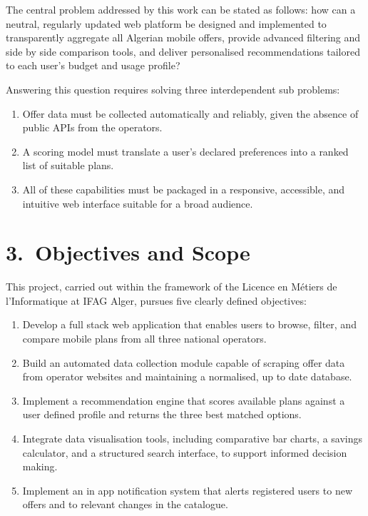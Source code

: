 The central problem addressed by this work can be stated as follows: how can a neutral, regularly updated web platform be designed and implemented to transparently aggregate all Algerian mobile offers, provide advanced filtering and side by side comparison tools, and deliver personalised recommendations tailored to each user's budget and usage profile?

Answering this question requires solving three interdependent sub problems:

\begin{enumerate}
  \item Offer data must be collected automatically and reliably, given the absence of public APIs from the operators.
  \item A scoring model must translate a user's declared preferences into a ranked list of suitable plans.
  \item All of these capabilities must be packaged in a responsive, accessible, and intuitive web interface suitable for a broad audience.
\end{enumerate}

\section*{3.~Objectives and Scope}

This project, carried out within the framework of the Licence en Métiers de l'Informatique at IFAG Alger, pursues five clearly defined objectives:

\begin{enumerate}
  \item Develop a full stack web application that enables users to browse, filter, and compare mobile plans from all three national operators.
  \item Build an automated data collection module capable of scraping offer data from operator websites and maintaining a normalised, up to date database.
  \item Implement a recommendation engine that scores available plans against a user defined profile and returns the three best matched options.
  \item Integrate data visualisation tools, including comparative bar charts, a savings calculator, and a structured search interface, to support informed decision making.
  \item Implement an in app notification system that alerts registered users to new offers and to relevant changes in the catalogue.
\end{enumerate}

